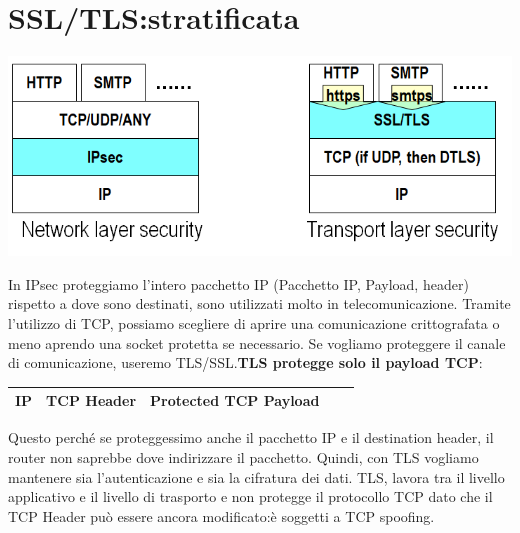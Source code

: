 \documentclass{book}
\theoremstyle{remark}
\begin{document}
\section{SSL/TLS:\@Visione stratificata}
\begin{center}
	\includegraphics[scale=0.4]{SSL_TLS.png}
\end{center}
In IPsec proteggiamo l'intero pacchetto IP (Pacchetto IP, Payload, header) rispetto a dove sono destinati, sono utilizzati molto in telecomunicazione\@. \newline
Tramite l'utilizzo di TCP, possiamo scegliere di aprire una comunicazione crittografata o meno aprendo una socket protetta se necessario\@. Se vogliamo proteggere il canale di comunicazione, useremo TLS/SSL\@.\textbf{TLS protegge solo il payload TCP}:
\begin{center}
	\begin{tabular}{ |c|c|c|c|c| }
		\hline
		IP & TCP Header & \textbf{Protected TCP Payload} \\
		\hline
	\end{tabular}
\end{center}
Questo perché se proteggessimo anche il pacchetto IP e il destination header, il router non saprebbe dove indirizzare il pacchetto\@. Quindi, con TLS vogliamo mantenere sia l'autenticazione e sia la cifratura dei dati\@.\newline
TLS, lavora tra il livello applicativo e il livello di trasporto e non protegge il protocollo TCP dato che il TCP Header può essere ancora modificato:\@si è soggetti a TCP spoofing\@.
\end{document}
